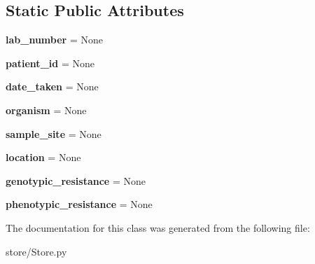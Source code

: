 \subsection*{Static Public Attributes}
\begin{DoxyCompactItemize}
\item 
\hypertarget{classstore_1_1_store_1_1_isolate_ab6c42ec02ecd9a44732058c4aae265c9}{{\bfseries lab\-\_\-number} = None}\label{classstore_1_1_store_1_1_isolate_ab6c42ec02ecd9a44732058c4aae265c9}

\item 
\hypertarget{classstore_1_1_store_1_1_isolate_ae75afdb7ee3b0064c954d04137a780e8}{{\bfseries patient\-\_\-id} = None}\label{classstore_1_1_store_1_1_isolate_ae75afdb7ee3b0064c954d04137a780e8}

\item 
\hypertarget{classstore_1_1_store_1_1_isolate_aeb1865270e2f3c91a369dfe3ee623e48}{{\bfseries date\-\_\-taken} = None}\label{classstore_1_1_store_1_1_isolate_aeb1865270e2f3c91a369dfe3ee623e48}

\item 
\hypertarget{classstore_1_1_store_1_1_isolate_adc178450407285b305d7e5cecc5f3c18}{{\bfseries organism} = None}\label{classstore_1_1_store_1_1_isolate_adc178450407285b305d7e5cecc5f3c18}

\item 
\hypertarget{classstore_1_1_store_1_1_isolate_a6e37fe0a9078265740a69500412c5f22}{{\bfseries sample\-\_\-site} = None}\label{classstore_1_1_store_1_1_isolate_a6e37fe0a9078265740a69500412c5f22}

\item 
\hypertarget{classstore_1_1_store_1_1_isolate_accd39029d15f572cf5b0df8e172a30da}{{\bfseries location} = None}\label{classstore_1_1_store_1_1_isolate_accd39029d15f572cf5b0df8e172a30da}

\item 
\hypertarget{classstore_1_1_store_1_1_isolate_a6da2aeb5cc045213fc76e2118c68ac98}{{\bfseries genotypic\-\_\-resistance} = None}\label{classstore_1_1_store_1_1_isolate_a6da2aeb5cc045213fc76e2118c68ac98}

\item 
\hypertarget{classstore_1_1_store_1_1_isolate_a70dbfa8aa91dfc5817dfdfe54f879b5d}{{\bfseries phenotypic\-\_\-resistance} = None}\label{classstore_1_1_store_1_1_isolate_a70dbfa8aa91dfc5817dfdfe54f879b5d}

\end{DoxyCompactItemize}


The documentation for this class was generated from the following file\-:\begin{DoxyCompactItemize}
\item 
store/Store.\-py\end{DoxyCompactItemize}
